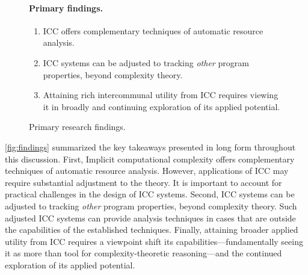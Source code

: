 \begin{figure}[h]
\begin{mdframed} %
\paragraph*{Primary findings.}
\begin{enumerate}[wide, labelwidth=!, labelindent=0pt]
\item ICC offers complementary techniques of automatic resource analysis.
\item ICC systems can be adjusted to tracking \emph{other} program properties, beyond complexity theory.
\item Attaining rich intercommunal utility from ICC requires viewing it in broadly and continuing exploration of its applied potential.
\end{enumerate}
\end{mdframed}
\caption[Primary research findings summarized]{Primary research findings.}
\label{fig:findings}
\end{figure}

\autoref{fig:findings} summarized the key takeaways presented in long form throughout this discussion.
First, Implicit computational complexity offers complementary techniques of automatic resource analysis.
However, applications of ICC may require substantial adjustment to the theory.
It is important to account for practical challenges in the design of ICC systems.
Second, ICC systems can be adjusted to tracking \emph{other} program properties, beyond complexity theory.
Such adjusted ICC systems can provide analysis techniques in cases that are outside the capabilities of the established techniques.
Finally, attaining broader applied utility from ICC requires a viewpoint shift \wrt its capabilities---\ie fundamentally seeing it as more than tool for complexity-theoretic reasoning---and the continued exploration of its applied potential.

\section{}